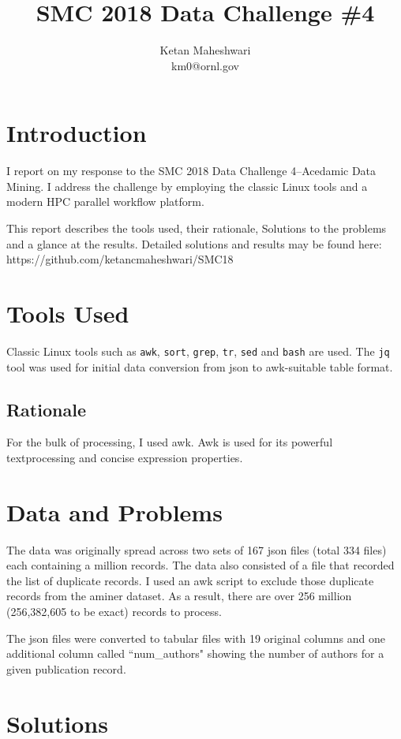 \documentclass{report}
\title{SMC 2018 Data Challenge \#4}
\author{Ketan Maheshwari\\ km0@ornl.gov}
\begin{document}
\maketitle
\section*{Introduction}

I report on my response to the SMC 2018 Data Challenge 4--Acedamic Data Mining.
I address the challenge by employing the classic Linux tools and a modern HPC
parallel workflow platform.

This report describes the tools used, their rationale, Solutions to the
problems and a glance at the results. Detailed solutions and results may be
found here: https://github.com/ketancmaheshwari/SMC18

\section*{Tools Used}
Classic Linux tools such as \texttt{awk}, \texttt{sort}, \texttt{grep},
\texttt{tr}, \texttt{sed} and \texttt{bash} are used.  The \texttt{jq} tool was
used for initial data conversion from json to awk-suitable table format. 

\subsection*{Rationale}
For the bulk of processing, I used awk. Awk is used for its powerful
textprocessing and concise expression properties. 

\section*{Data and Problems}
The data was originally spread across two sets of 167 json files (total 334
files) each containing a million records. The data also consisted of a file
that recorded the list of duplicate records. I used an awk script to exclude
those duplicate records from the aminer dataset. As a result, there are over
256 million (256,382,605 to be exact) records to process.

The json files were converted to tabular files with 19 original columns and one
additional column called ``num\_authors" showing the number of authors for a given
publication record.

\section*{Solutions}
\end{document}
